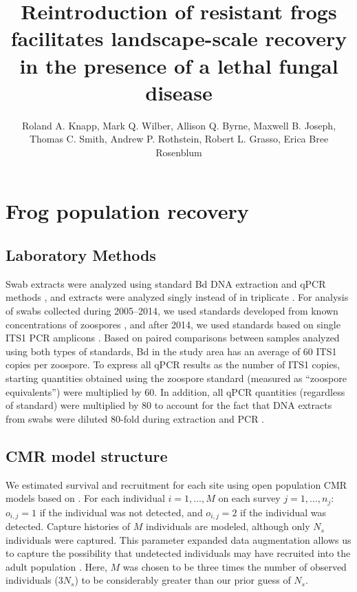 \documentclass[9pt,twoside,lineno]{pnas-new}
\title{Reintroduction of resistant frogs facilitates landscape-scale recovery in the presence of a lethal fungal disease}
\author{Roland A. Knapp, Mark Q. Wilber, Allison Q. Byrne, Maxwell B. Joseph, Thomas C. Smith, Andrew P. Rothstein, Robert L. Grasso, Erica Bree Rosenblum}
\begin{document}
\maketitle

\SItext
\hypertarget{frog-population-recovery-2}{%
\section{Frog population
recovery}\label{frog-population-recovery-2}}

\hypertarget{laboratory-methods}{%
\subsection{Laboratory Methods}\label{laboratory-methods}}

Swab extracts were analyzed using standard Bd DNA extraction and qPCR
methods \citep{boyle2004}, and extracts were analyzed singly instead of
in triplicate \citep{kriger2006}. For analysis of swabs collected during
2005--2014, we used standards developed from known concentrations of
zoospores \citep{boyle2004}, and after 2014, we used standards based on
single ITS1 PCR amplicons \citep{longo2013}. Based on paired comparisons
between samples analyzed using both types of standards, Bd in the study
area has an average of 60 ITS1 copies per zoospore. To express all qPCR
results as the number of ITS1 copies, starting quantities obtained using
the zoospore standard (measured as ``zoospore equivalents'') were
multiplied by 60. In addition, all qPCR quantities (regardless of
standard) were multiplied by 80 to account for the fact that DNA
extracts from swabs were diluted 80-fold during extraction and PCR
\citep{vredenburg2010}.

\hypertarget{cmr-model-structure}{%
\subsection{CMR model structure}\label{cmr-model-structure}}

We estimated survival and recruitment for each site using open
population CMR models based on \citep{joseph2018}. For each individual
\(i=1, ..., M\) on each survey \(j=1, ..., n_j\): \(o_{i, j} = 1\) if
the individual was not detected, and \(o_{i, j}=2\) if the individual
was detected. Capture histories of \(M\) individuals are modeled,
although only \(N_s\) individuals were captured. This parameter expanded
data augmentation allows us to capture the possibility that undetected
individuals may have recruited into the adult population
\citep{royle2012}. Here, \(M\) was chosen to be three times the number
of observed individuals (\(3N_s\)) to be considerably greater than our
prior guess of \(N_s\).
\end{document}
